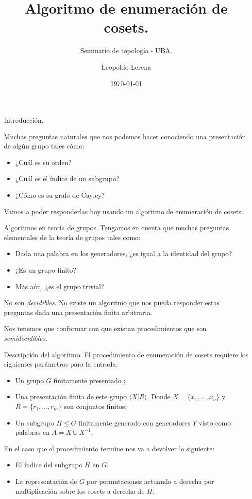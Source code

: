 \documentclass[aspectratio=169, 9pt]{beamer}
\title{Algoritmo de enumeración de cosets.}
\subtitle{Seminario de topología - UBA.}
\date{\today}
\author{Leopoldo Lerena}
\institute{Universidad de Buenos Aires}
\newcommand{\fg}{finitamente generado }
\newcommand{\fp}{finitamente presentado }
\begin{document}
\maketitle

\begin{frame}[fragile]{Introducción.}


Muchas preguntas naturales que nos podemos hacer conociendo una presentación de algún grupo tales cómo:

\begin{itemize}
	\item ¿Cuál es su orden?
	\pause
	\item ¿Cuál es 	el índice de un subgrupo?
	\pause
	\item ¿Cómo es su grafo de Cayley?
	\pause
\end{itemize}

Vamos a poder responderlas hoy usando un algoritmo de enumeración de cosets.
\end{frame}

\begin{frame}[fragile]{Algoritmos en teoría de grupos.}
	Tengamos en cuenta que muchas preguntas elementales de la teoría de grupos tales como:
	\begin{itemize}
		\item Dada una palabra en los generadores, ¿es igual a la identidad del grupo?
		\pause
		\item ¿Es un grupo finito?
		\pause
		\item Más aún, ¿es el grupo trivial?
	\end{itemize}
	\pause
	No son \textit{decidibles}. 
	No existe un algoritmo que nos pueda responder estas preguntas dada una presentación finita arbitraria.
	\medskip
	
	\pause
	
	
	Nos tenemos que conformar con que existan procedimientos que son \textit{semidecidibles}. 
\end{frame}

\begin{frame}[fragile]{Descripción del algoritmo.}
	El procedimiento de enumeración de cosets requiere los siguientes parámetros para la entrada:
	\begin{itemize}
		\item Un grupo $G$ \fp;
		\pause
		\item Una presentación finita de este grupo $\langle X | R \rangle$.
			Donde $X = \{ x_1, \dots, x_n \}$ y $R = \{ r_1, \dots, r_m \}$ son conjuntos finitos;
 		\pause
		\item Un subgrupo $H \le G$  \fg con generadores $Y$ visto como palabras en $A = X \cup X^{-1}$.
	\end{itemize}
	\pause
	\medskip
	
	En el caso que el procedimiento termine nos va a devolver lo siguiente:
	\pause
	\begin{itemize}
		\item El índice del subgrupo $H$ en $G$.
		\pause
		\item La representación de $G$ por permutaciones actuando a derecha por multiplicación sobre los cosets a derecha de $H$.
	\end{itemize}  
\end{frame}
\end{document}

